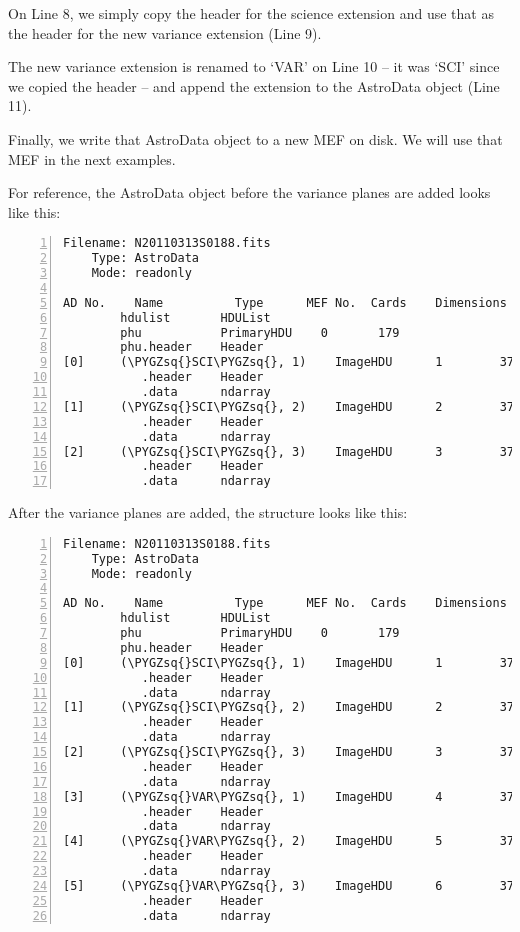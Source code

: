 \documentclass[letterpaper,10pt,english]{sphinxmanual}
\def\PYGZsq{\char`\'}
\begin{document}
On Line 8, we simply copy the header for the science extension and use that
as the header for the new variance extension (Line 9).

The new variance extension is renamed to `VAR' on Line 10 -- it was `SCI' since
we copied the header -- and append the extension to the AstroData object
(Line 11).

Finally, we write that AstroData object to a new MEF on disk.  We will use
that MEF in the next examples.

For reference, the AstroData object before the variance planes are added looks
like this:

\begin{Verbatim}[commandchars=\\\{\},numbers=left,firstnumber=1,stepnumber=1]
Filename: N20110313S0188.fits
    Type: AstroData
    Mode: readonly

AD No.    Name          Type      MEF No.  Cards    Dimensions   Format
        hdulist       HDUList
        phu           PrimaryHDU    0       179
        phu.header    Header
[0]     (\PYGZsq{}SCI\PYGZsq{}, 1)    ImageHDU      1        37    (2304, 1056)  float32
           .header    Header
           .data      ndarray
[1]     (\PYGZsq{}SCI\PYGZsq{}, 2)    ImageHDU      2        37    (2304, 1056)  float32
           .header    Header
           .data      ndarray
[2]     (\PYGZsq{}SCI\PYGZsq{}, 3)    ImageHDU      3        37    (2304, 1056)  float32
           .header    Header
           .data      ndarray
\end{Verbatim}

After the variance planes are added, the structure looks like this:

\begin{Verbatim}[commandchars=\\\{\},numbers=left,firstnumber=1,stepnumber=1]
Filename: N20110313S0188.fits
    Type: AstroData
    Mode: readonly

AD No.    Name          Type      MEF No.  Cards    Dimensions   Format
        hdulist       HDUList
        phu           PrimaryHDU    0       179
        phu.header    Header
[0]     (\PYGZsq{}SCI\PYGZsq{}, 1)    ImageHDU      1        37    (2304, 1056)  float32
           .header    Header
           .data      ndarray
[1]     (\PYGZsq{}SCI\PYGZsq{}, 2)    ImageHDU      2        37    (2304, 1056)  float32
           .header    Header
           .data      ndarray
[2]     (\PYGZsq{}SCI\PYGZsq{}, 3)    ImageHDU      3        37    (2304, 1056)  float32
           .header    Header
           .data      ndarray
[3]     (\PYGZsq{}VAR\PYGZsq{}, 1)    ImageHDU      4        37    (2304, 1056)  float32
           .header    Header
           .data      ndarray
[4]     (\PYGZsq{}VAR\PYGZsq{}, 2)    ImageHDU      5        37    (2304, 1056)  float32
           .header    Header
           .data      ndarray
[5]     (\PYGZsq{}VAR\PYGZsq{}, 3)    ImageHDU      6        37    (2304, 1056)  float32
           .header    Header
           .data      ndarray
\end{Verbatim}
\end{document}
